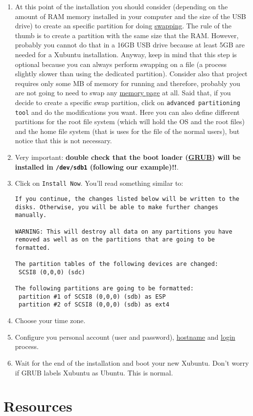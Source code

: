 \begin{enumerate}
\item At this point of the installation you should consider (depending
  on the amount of RAM memory installed in your computer and the size
  of the USB drive) to create an specific partition for doing
  \href{https://en.wikipedia.org/wiki/Swapping}{swapping}. The rule of
  the thumb is to create a partition with the same size that the
  RAM. However, probably you cannot do that in a 16GB USB drive because
  at least 5GB are needed for a Xubuntu installation. Anyway, keep in
  mind that this step is optional because you can always perform
  swapping on a file (a process slightly slower than using the
  dedicated partition). Consider also that project requires only some
  MB of memory for running and therefore, probably you are not going
  to need to swap any
  \href{https://en.wikipedia.org/wiki/Page_(computer_memory)}{memory
    page} at all. Said that, if you decide to create a specific swap
  partition, click on \verb|advanced partitioning tool| and do the
  modifications you want. Here you can also define different
  partitions for the root file system (which will hold the OS and the
  root files) and the home file system (that is uses for the file of
  the normal users), but notice that this is not necessary.

\item Very important: \textbf{double check that the boot loader
  (\href{https://www.gnu.org/software/grub/}{GRUB}) will be installed
  in \texttt{/dev/sdb1} (following our example)!!}.

\item Click on \verb|Install Now|. You'll read something similar to:

\begin{verbatim}
If you continue, the changes listed below will be written to the disks. Otherwise, you will be able to make further changes manually.

WARNING: This will destroy all data on any partitions you have removed as well as on the partitions that are going to be formatted.

The partition tables of the following devices are changed:
 SCSI8 (0,0,0) (sdc)

The following partitions are going to be formatted:
 partition #1 of SCSI8 (0,0,0) (sdb) as ESP
 partition #2 of SCSI8 (0,0,0) (sdb) as ext4
\end{verbatim}

\item Choose your time zone.
  
\item Configure you personal account (user and password),
  \href{https://en.wikipedia.org/wiki/Hostname}{hostname} and
  \href{https://en.wikipedia.org/wiki/Login}{login} process.
  
\item Wait for the end of the installation and boot your new
  Xubuntu. Don't worry if GRUB labels Xubuntu as Ubuntu. This is
  normal.
  
\end{enumerate}

\section{Resources}


